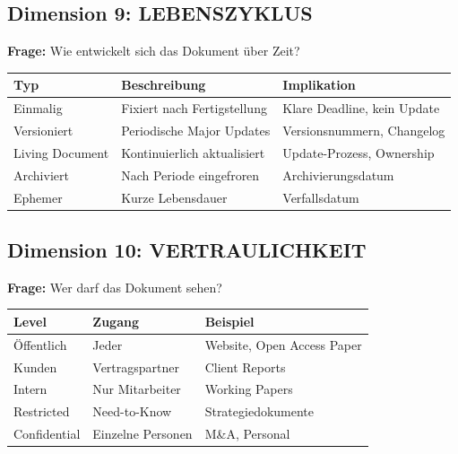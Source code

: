 \documentclass[12pt,a4paper]{article}
\begin{document}
\subsection{Dimension 9: LEBENSZYKLUS}

\textbf{Frage:} Wie entwickelt sich das Dokument über Zeit?

\begin{table}[htbp]
\centering
\renewcommand{\arraystretch}{1.3}
\begin{tabular}{@{}lp{5cm}p{4cm}@{}}
\toprule
\textbf{Typ} & \textbf{Beschreibung} & \textbf{Implikation} \\
\midrule
Einmalig & Fixiert nach Fertigstellung & Klare Deadline, kein Update \\
Versioniert & Periodische Major Updates & Versionsnummern, Changelog \\
Living Document & Kontinuierlich aktualisiert & Update-Prozess, Ownership \\
Archiviert & Nach Periode eingefroren & Archivierungsdatum \\
Ephemer & Kurze Lebensdauer & Verfallsdatum \\
\bottomrule
\end{tabular}
\end{table}

\subsection{Dimension 10: VERTRAULICHKEIT}

\textbf{Frage:} Wer darf das Dokument sehen?

\begin{table}[htbp]
\centering
\renewcommand{\arraystretch}{1.3}
\begin{tabular}{@{}lp{5cm}l@{}}
\toprule
\textbf{Level} & \textbf{Zugang} & \textbf{Beispiel} \\
\midrule
Öffentlich & Jeder & Website, Open Access Paper \\
Kunden & Vertragspartner & Client Reports \\
Intern & Nur Mitarbeiter & Working Papers \\
Restricted & Need-to-Know & Strategiedokumente \\
Confidential & Einzelne Personen & M\&A, Personal \\
\bottomrule
\end{tabular}
\end{table}
\end{document}

